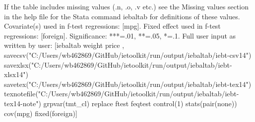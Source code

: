 If the table includes missing values (.n, .o, .v etc.) see the Missing values section in the help file for the Stata command iebaltab for definitions of these values. Covariate(s) used in f-test regressions: [mpg]. Fixed effect used in f-test regressions: [foreign]. Significance: ***=.01, **=.05, *=.1. Full user input as written by user: [iebaltab weight price , savecsv("C:/Users/wb462869/GitHub/ietoolkit/run/output/iebaltab/iebt-csv14") savexlsx("C:/Users/wb462869/GitHub/ietoolkit/run/output/iebaltab/iebt-xlsx14") savetex("C:/Users/wb462869/GitHub/ietoolkit/run/output/iebaltab/iebt-tex14") texnotefile("C:/Users/wb462869/GitHub/ietoolkit/run/output/iebaltab/iebt-tex14-note") grpvar(tmt\_cl) replace ftest feqtest control(1) stats(pair(none)) cov(mpg) fixed(foreign)]

